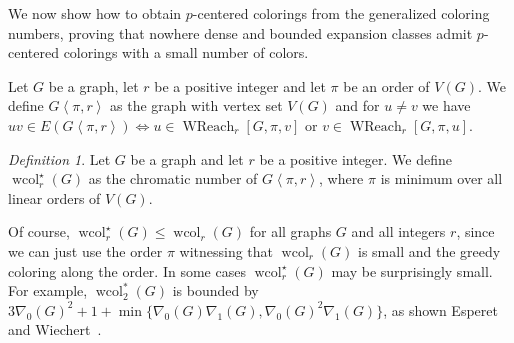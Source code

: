 \documentclass[1p,number,a4paper]{elsarticle}
\theoremstyle{remark}
\newcommand{\Ff}{\mathcal{F}}
\DeclareMathOperator{\wcol}{wcol}
\DeclareMathOperator{\WReach}{WReach}
\newtheorem{theorem}{Theorem}[section]
\newtheorem{definition}[theorem]{Definition}
\begin{document}
We now show how to obtain $p$-centered colorings from the generalized coloring numbers, proving that nowhere dense and bounded expansion classes admit $p$-centered colorings with a small number of colors. 



Let $G$ be a graph, let $r$ be a positive integer and let $\pi$ be an order of $V(G)$. We define $G\left\langle \pi,r\right\rangle$ as the 
graph with vertex set $V(G)$ and for $u\neq v$ we have $uv\in E(G\left\langle \pi,r\right\rangle)\Leftrightarrow u\in \WReach_r[G,\pi,v]$ or $v\in \WReach_r[G,\pi,u]$. 

\begin{definition}
  Let $G$ be a graph and let $r$ be a positive integer. 
  We define $\wcol_r^\star(G)$ as the chromatic number
  of $G\left\langle \pi,r\right\rangle$, where $\pi$ is minimum over
  all linear orders of $V(G)$.
  \end{definition}
  
  Of course, $\wcol_r^\star(G)\leq \wcol_r(G)$ for all 
  graphs $G$ and all integers $r$, since we can just use the order $\pi$ witnessing that $\wcol_r(G)$ is small and the greedy 
  coloring along the order. In some 
  cases $\wcol_r^\star(G)$ may be surprisingly small. For example, $\wcol_2^*(G)$ is bounded by $3\nabla_0(G)^2+1+\min\{\nabla_0(G)\nabla_1(G), \nabla_0(G)^2\nabla_1(G)\}$, as shown Esperet and Wiechert~\cite{EsperetW18}. 
  

  
\end{document}
